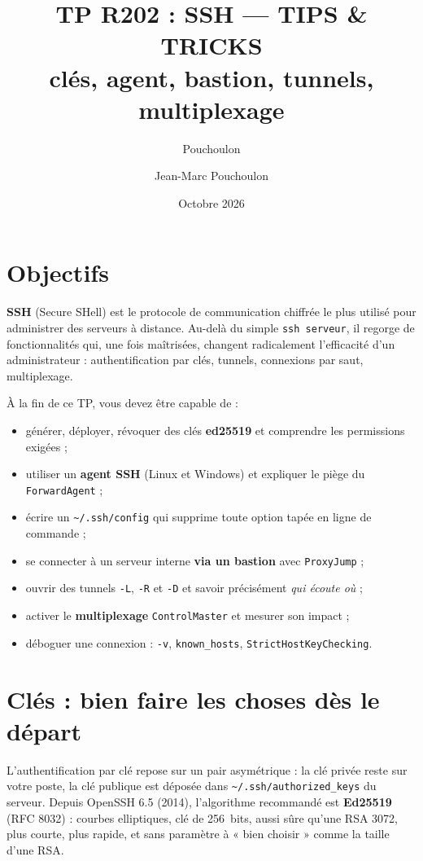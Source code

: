 \documentclass[a4paper,10pt]{exam}
\author{Pouchoulon}
\author{Jean-Marc Pouchoulon}
\title{TP R202 : SSH --- TIPS \& TRICKS\\{\small clés, agent, bastion, tunnels, multiplexage}}
\date{Octobre 2026}
\begin{document}
\maketitle

\section{Objectifs}

\textbf{SSH} (Secure SHell) est le protocole de communication chiffrée le plus utilisé pour
administrer des serveurs à distance. Au-delà du simple \texttt{ssh serveur}, il regorge de
fonctionnalités qui, une fois maîtrisées, changent radicalement l'efficacité d'un administrateur :
authentification par clés, tunnels, connexions par saut, multiplexage.

À la fin de ce TP, vous devez être capable de :
\begin{itemize}
  \item générer, déployer, révoquer des clés \textbf{ed25519} et comprendre les permissions exigées ;
  \item utiliser un \textbf{agent SSH} (Linux et Windows) et expliquer le piège du \texttt{ForwardAgent} ;
  \item écrire un \texttt{\textasciitilde/.ssh/config} qui supprime toute option tapée en ligne de commande ;
  \item se connecter à un serveur interne \textbf{via un bastion} avec \texttt{ProxyJump} ;
  \item ouvrir des tunnels \texttt{-L}, \texttt{-R} et \texttt{-D} et savoir précisément \emph{qui écoute où} ;
  \item activer le \textbf{multiplexage} \texttt{ControlMaster} et mesurer son impact ;
  \item déboguer une connexion : \texttt{-v}, \texttt{known\_hosts}, \texttt{StrictHostKeyChecking}.
\end{itemize}

\section{Clés : bien faire les choses dès le départ}

L'authentification par clé repose sur un pair asymétrique : la clé privée reste sur votre poste,
la clé publique est déposée dans \texttt{\textasciitilde/.ssh/authorized\_keys} du serveur.
Depuis OpenSSH 6.5 (2014), l'algorithme recommandé est \textbf{Ed25519} (RFC 8032) :
courbes elliptiques, clé de 256~bits, aussi sûre qu'une RSA 3072, plus courte, plus rapide,
et sans paramètre à « bien choisir » comme la taille d'une RSA.
\end{document}
